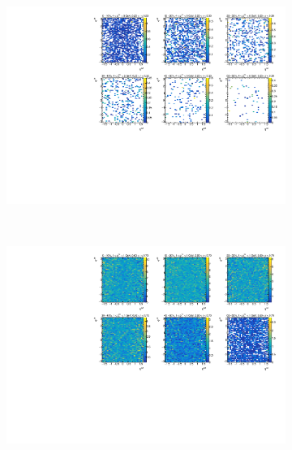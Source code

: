 \begin{figure}
\begin{subfigure}{.5\textwidth}
\caption{}
\end{subfigure}  \quad
\begin{subfigure}{.5\textwidth}
\centering \includegraphics[width=1\textwidth]{figures/main/UE/eta_phi_map_trk6_dR5}
\caption{}
\end{subfigure} \\
\begin{subfigure}{.5\textwidth}
\centering \includegraphics[width=1\textwidth]{figures/main/UE/eta_phi_map_trk2_dR9}
\caption{}
\end{subfigure} \quad
\begin{subfigure}{.5\textwidth}

\end{subfigure}
\end{figure}
